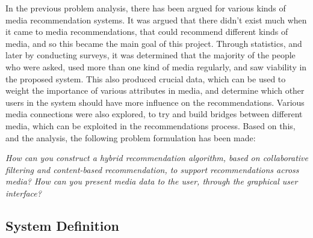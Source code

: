 In the previous problem analysis, there has been argued for various kinds of media recommendation systems. It was argued that there didn’t exist much when it came to media recommendations, that could recommend different kinds of media, and so this became the main goal of this project. Through statistics, and later by conducting surveys, it was determined that the majority of the people who were asked, used more than one kind of media regularly, and saw viability in the proposed system. This also produced crucial data, which can be used to weight the importance of various attributes in media, and determine which other users in the system should have more influence on the recommendations. Various media connections were also explored, to try and build bridges between different media, which can be exploited in the recommendations process. Based on this, and the analysis, the following problem formulation has been made:

\textit{How can you construct a hybrid recommendation algorithm, based on collaborative filtering and content-based recommendation, to support recommendations across media? How can you present media data to the user, through the graphical user interface?}

\subsection{System Definition}
\label{SysDefinition}
